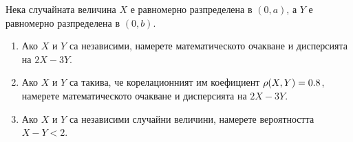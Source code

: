 \documentclass{../../common/topic}
\begin{document}
\begin{problem}\label{ex:se_autumn2016}
  Нека случайната величина \( X \) е равномерно разпределена в \( (0, a) \), а \( Y \) е равномерно разпределена в \( (0, b) \).
  \begin{enumerate}[label=\alph*)]
    \item Ако \( X \) и \( Y \) са независими, намерете математическото очакване и дисперсията на \( 2X - 3Y \).
    \item Ако \( X \) и \( Y \) са такива, че корелационният им коефициент \( \operatorname{\rho}(X, Y) = 0.8 \), намерете математическото очакване и дисперсията на \( 2X - 3Y \).
    \item Ако \( X \) и \( Y \) са независими случайни величини, намерете вероятността \( X - Y < 2 \).
  \end{enumerate}
\end{problem}
\end{document}
